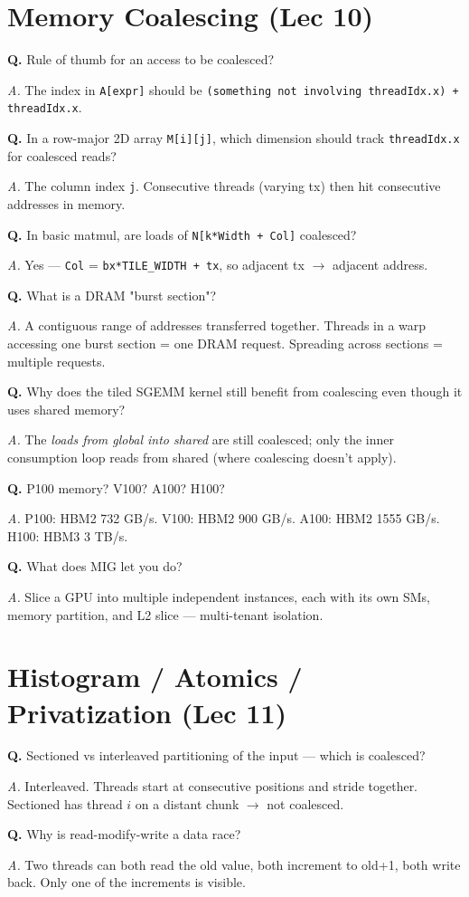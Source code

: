 \documentclass[10pt]{article}
\newcommand{\q}[1]{\par\vspace{6pt}\noindent\textbf{Q.} #1}
\newcommand{\ans}[1]{\par\noindent\textit{A.} #1\par}
\begin{document}
\hrulefill

\section*{Memory Coalescing (Lec 10)}

\q{Rule of thumb for an access to be coalesced?}
\ans{The index in \texttt{A[expr]} should be \texttt{(something not involving threadIdx.x) + threadIdx.x}.}

\q{In a row-major 2D array \texttt{M[i][j]}, which dimension should track \texttt{threadIdx.x} for coalesced reads?}
\ans{The column index \texttt{j}. Consecutive threads (varying tx) then hit consecutive addresses in memory.}

\q{In basic matmul, are loads of \texttt{N[k*Width + Col]} coalesced?}
\ans{Yes — \texttt{Col} = \texttt{bx*TILE\_WIDTH + tx}, so adjacent tx $\rightarrow$ adjacent address.}

\q{What is a DRAM "burst section"?}
\ans{A contiguous range of addresses transferred together. Threads in a warp accessing one burst section = one DRAM request. Spreading across sections = multiple requests.}

\q{Why does the tiled SGEMM kernel still benefit from coalescing even though it uses shared memory?}
\ans{The \emph{loads from global into shared} are still coalesced; only the inner consumption loop reads from shared (where coalescing doesn't apply).}

\q{P100 memory? V100? A100? H100?}
\ans{P100: HBM2 732 GB/s. V100: HBM2 900 GB/s. A100: HBM2 1555 GB/s. H100: HBM3 3 TB/s.}

\q{What does MIG let you do?}
\ans{Slice a GPU into multiple independent instances, each with its own SMs, memory partition, and L2 slice — multi-tenant isolation.}

\hrulefill

\section*{Histogram / Atomics / Privatization (Lec 11)}

\q{Sectioned vs interleaved partitioning of the input — which is coalesced?}
\ans{Interleaved. Threads start at consecutive positions and stride together. Sectioned has thread $i$ on a distant chunk $\rightarrow$ not coalesced.}

\q{Why is read-modify-write a data race?}
\ans{Two threads can both read the old value, both increment to old+1, both write back. Only one of the increments is visible.}
\end{document}
